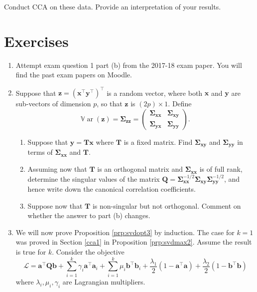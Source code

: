 \documentclass[
]{book}
\providecommand{\tightlist}{%
  \setlength{\itemsep}{0pt}\setlength{\parskip}{0pt}}
\theoremstyle{definition}
\theoremstyle{definition}
\theoremstyle{definition}
\theoremstyle{definition}
\theoremstyle{remark}
\begin{document}
Conduct CCA on these data. Provide an interpretation of your results.

\hypertarget{exercises-2}{%
\section{Exercises}\label{exercises-2}}

\begin{enumerate}
\def\labelenumi{\arabic{enumi}.}
\item
  Attempt exam question 1 part (b) from the 2017-18 exam paper. You will find the past exam papers on Moodle.
\item
  Suppose that \(\mathbf z= (\mathbf x^\top \mathbf y^\top)^\top\) is a random vector, where both \(\mathbf x\) and \(\mathbf y\) are sub-vectors of dimension \(p\), so that \(\mathbf z\) is \((2p)\times 1\). Define
  \[{\mathbb{V}\operatorname{ar}}(\mathbf z)=\boldsymbol{\Sigma}_{\mathbf z\mathbf z}=\begin{pmatrix} \boldsymbol{\Sigma}_{\mathbf x\mathbf x} & \boldsymbol{\Sigma}_{\mathbf x\mathbf y}\\\boldsymbol{\Sigma}_{\mathbf y\mathbf x} & \boldsymbol{\Sigma}_{\mathbf y\mathbf y}  \end{pmatrix}.\]

  \begin{enumerate}
  \def\labelenumii{\roman{enumii}.}
  \tightlist
  \item
    Suppose that \(\mathbf y= \mathbf T\mathbf x\) where \(\mathbf T\) is a fixed matrix. Find \(\boldsymbol{\Sigma}_{\mathbf x\mathbf y}\) and \(\boldsymbol{\Sigma}_{\mathbf y\mathbf y}\) in terms of \(\boldsymbol{\Sigma}_{\mathbf x\mathbf x}\) and \(\mathbf T\).
  \item
    Assuming now that \(\mathbf T\) is an orthogonal matrix and \(\boldsymbol{\Sigma}_{\mathbf x\mathbf x}\) is of full rank, determine the singular values of the matrix \(\mathbf Q=\boldsymbol{\Sigma}_{\mathbf x\mathbf x}^{-1/2}\boldsymbol{\Sigma}_ {\mathbf x\mathbf y}\boldsymbol{\Sigma}_{\mathbf y\mathbf y}^{-1/2}\), and hence write down the canonical correlation coefficients.
  \item
    Suppose now that \(\mathbf T\) is non-singular but not orthogonal. Comment on whether the answer to part (b) changes.
  \end{enumerate}
\item
  We will now prove Proposition \ref{prp:svdopt3} by induction.
  The case for \(k=1\) was proved in Section \ref{cca1} in Proposition \ref{prp:svdmax2}. Assume the result is true for \(k\). Consider the objective
  \[\mathcal{L} = \mathbf a^\top \mathbf Q\mathbf b+ \sum_{i=1}^k \gamma_i\mathbf a^\top \mathbf a_i + \sum_{i=1}^k \mu_i\mathbf b^\top \mathbf b_i + \frac{\lambda_1}{2}(1-\mathbf a^\top\mathbf a)+ \frac{\lambda_2}{2}(1-\mathbf b^\top\mathbf b)\]
  where \(\lambda_i, \mu_i, \gamma_i\) are Lagrangian multipliers.


\end{enumerate}
\end{document}
